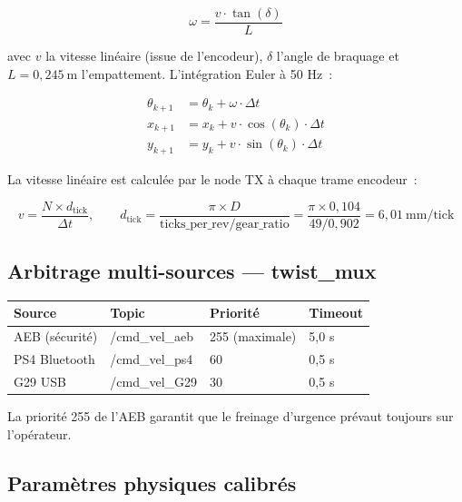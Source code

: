 \documentclass[a4paper,11pt]{article}
\begin{document}
\begin{equation}
  \omega = \frac{v \cdot \tan(\delta)}{L}
\end{equation}

avec $v$ la vitesse linéaire (issue de l'encodeur), $\delta$ l'angle de braquage et
$L = 0{,}245\ \text{m}$ l'empattement. L'intégration Euler à 50 Hz~:

\begin{align}
  \theta_{k+1} &= \theta_k + \omega \cdot \Delta t \\
  x_{k+1}      &= x_k + v \cdot \cos(\theta_k) \cdot \Delta t \\
  y_{k+1}      &= y_k + v \cdot \sin(\theta_k) \cdot \Delta t
\end{align}

La vitesse linéaire est calculée par le node TX à chaque trame encodeur~:

\begin{equation}
  v = \frac{N \times d_{\text{tick}}}{\Delta t}, \qquad
  d_{\text{tick}} = \frac{\pi \times D}{\text{ticks\_per\_rev} / \text{gear\_ratio}}
  = \frac{\pi \times 0{,}104}{49 / 0{,}902} = 6{,}01\ \text{mm/tick}
\end{equation}

\subsection{Arbitrage multi-sources — twist\_mux}

\begin{center}
\begin{tabular}{llll}
\toprule
\textbf{Source} & \textbf{Topic} & \textbf{Priorité} & \textbf{Timeout} \\
\midrule
AEB (sécurité) & /cmd\_vel\_aeb & 255 (maximale) & 5,0 s \\
PS4 Bluetooth  & /cmd\_vel\_ps4 & 60 & 0,5 s \\
G29 USB        & /cmd\_vel\_G29 & 30 & 0,5 s \\
\bottomrule
\end{tabular}
\end{center}

La priorité 255 de l'AEB garantit que le freinage d'urgence prévaut toujours sur
l'opérateur.

\subsection{Paramètres physiques calibrés}
\end{document}
